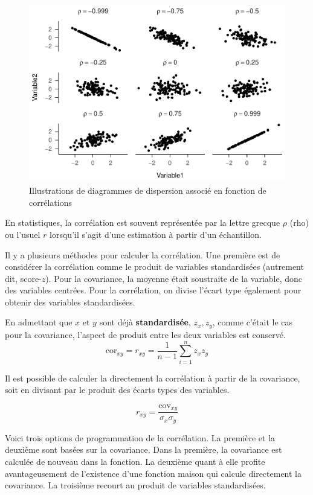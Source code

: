 \documentclass[
]{book}
\begin{document}
\begin{figure}

{\centering \includegraphics[width=0.5\linewidth,height=0.5\textheight]{09-Analyser_files/figure-latex/corimage-1} 

}

\caption{Illustrations de diagrammes de dispersion associé en fonction de corrélations}\label{fig:corimage}
\end{figure}

En statistiques, la corrélation est souvent représentée par la lettre grecque \(\rho\) (rho) ou l'usuel \(r\) lorsqu'il s'agit d'une estimation à partir d'un échantillon.

Il y a plusieurs méthodes pour calculer la corrélation. Une première est de considérer la corrélation comme le produit de variables standardisées (autrement dit, score-\(z\)). Pour la covariance, la moyenne était soustraite de la variable, donc des variables centrées. Pour la corrélation, on divise l'écart type également pour obtenir des variables standardisées.

En admettant que \(x\) et \(y\) sont déjà \textbf{standardisée}, \(z_x,z_y\), comme c'était le cas pour la covariance, l'aspect de produit entre les deux variables est conservé.
\[\text{cor}_{xy} = r_{xy}= \frac{1}{n-1}\sum_{i=1}^nz_xz_y\]

Il est possible de calculer la directement la corrélation à partir de la covariance, soit en divisant par le produit des écarts types des variables.

\[r_{xy} = \frac{\text{cov}_{xy}}{\sigma_x\sigma_y}\]

Voici trois options de programmation de la corrélation. La première et la deuxième sont basées sur la covariance. Dans la première, la covariance est calculée de nouveau dans la fonction. La deuxième quant à elle profite avantageusement de l'existence d'une fonction maison qui calcule directement la covariance. La troisième recourt au produit de variables standardisées.
\end{document}
